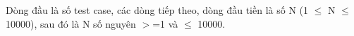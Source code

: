 Dòng đầu là số test case, các dòng tiếp theo, dòng đầu tiền là số N (1 $\le$ N  $\le$ 10000),  sau đó là N số nguyên $>$=1 và   $\le$  10000.